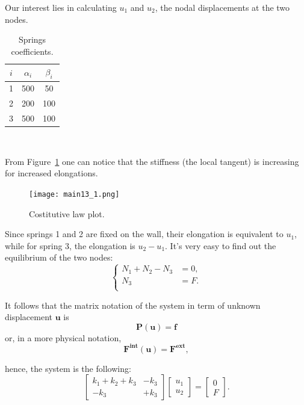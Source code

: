 Our interest lies in calculating $u_1$ and $u_2$, the nodal displacements at the two nodes.

\begin{table}[H]
    \centering 
    \begin{tabular}{ccc}
    \hline
    \rowcolor{bluepoli!40} %
    $i$ & $\alpha_i$ & $\beta_i$  \\
    \hline
    1 & 500 & 50 \\
    2 & 200 & 100 \\
    3 & 500 & 100 \\
    \hline
    \end{tabular}
    \\[10pt]
    \caption{Springs coefficients.}
    \label{table:alpha_beta}
\end{table}

From Figure~\ref{fig:main13_1} one can notice that the stiffness (the local tangent) is increasing for increased elongations.

\begin{figure}[H]
    \centering
    \texttt{[image: main13\_1.png]}
    \caption{Costitutive law plot.}
    \label{fig:main13_1}
\end{figure}

Since springs 1 and 2 are fixed on the wall, their elongation is equivalent to $u_1$, while for spring 3, the elongation is $u_2-u_1$. It's very easy to find out the equilibrium of the two nodes:
\begin{equation*}
\label{eq:spring_2}
\left\{
\begin{aligned}
N_1+N_2-N_3&=0, \\
N_3&=F.\\
\end{aligned}
\right.
\end{equation*}

It follows that the matrix notation of the system in term of unknown displacement $\mathbf{u}$ is
\begin{equation}
\label{eq:spring_25}
\mathbf{P}(\mathbf{u})=\mathbf{f}
\end{equation}
or, in a more physical notation,
\begin{equation*}
\label{eq:spring_275}
\mathbf{F}^{\textbf{int}}(\mathbf{u})=\mathbf{F}^{\textbf{ext}},
\end{equation*}

hence, the system is the following:
\begin{equation*}
\label{eq:spring_3}
\left[
\begin{array}{cc}
 k_1+k_2+k_3 &-k_3 \\
 -k_3 & +k_3
\end{array}
\right]
\left[
\begin{array}{c}
 u_1 \\
 u_2
\end{array}
\right]
=
\left[
\begin{array}{c}
 0 \\
 F
\end{array}
\right].
\end{equation*}

